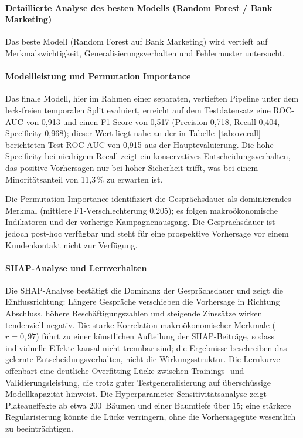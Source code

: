 \documentclass[10pt]{scrartcl}
\begin{document}
\paragraph{Detaillierte Analyse des besten Modells (Random Forest / Bank Marketing)}
\label{sec:detailed-analysis}

Das beste Modell (Random Forest auf Bank Marketing) wird vertieft auf Merkmalswichtigkeit, Generalisierungsverhalten und Fehlermuster untersucht.

\paragraph{Modellleistung und Permutation Importance}

Das finale Modell, hier im Rahmen einer separaten, vertieften Pipeline unter dem leck-freien temporalen Split evaluiert, erreicht auf dem Testdatensatz eine ROC-AUC von 0{,}913 und einen F1-Score von 0{,}517 (Precision 0{,}718, Recall 0{,}404, Specificity 0{,}968); dieser Wert liegt nahe an der in Tabelle~\ref{tab:overall} berichteten Test-ROC-AUC von 0{,}915 aus der Hauptevaluierung. Die hohe Specificity bei niedrigem Recall zeigt ein konservatives Entscheidungsverhalten, das positive Vorhersagen nur bei hoher Sicherheit trifft, was bei einem Minoritätsanteil von 11,3\,\% zu erwarten ist.

Die Permutation Importance identifiziert die Gesprächsdauer als dominierendes Merkmal (mittlere F1-Verschlechterung 0{,}205); es folgen makroökonomische Indikatoren und der vorherige Kampagnenausgang. Die Gesprächsdauer ist jedoch post-hoc verfügbar und steht für eine prospektive Vorhersage vor einem Kundenkontakt nicht zur Verfügung.

\paragraph{SHAP-Analyse und Lernverhalten}

Die SHAP-Analyse bestätigt die Dominanz der Gesprächsdauer und zeigt die Einflussrichtung: Längere Gespräche verschieben die Vorhersage in Richtung Abschluss, höhere Beschäftigungszahlen und steigende Zinssätze wirken tendenziell negativ. Die starke Korrelation makroökonomischer Merkmale ($r=0{,}97$) führt zu einer künstlichen Aufteilung der SHAP-Beiträge, sodass individuelle Effekte kausal nicht trennbar sind; die Ergebnisse beschreiben das gelernte Entscheidungsverhalten, nicht die Wirkungsstruktur. Die Lernkurve offenbart eine deutliche Overfitting-Lücke zwischen Trainings- und Validierungsleistung, die trotz guter Testgeneralisierung auf überschüssige Modellkapazität hinweist. Die Hyperparameter-Sensitivitätsanalyse zeigt Plateaueffekte ab etwa 200~Bäumen und einer Baumtiefe über 15; eine stärkere Regularisierung könnte die Lücke verringern, ohne die Vorhersagegüte wesentlich zu beeinträchtigen.
\end{document}
